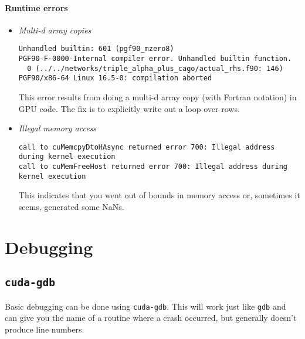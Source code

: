 \paragraph{Runtime errors}

\begin{itemize}

\item {\em Multi-d array copies}
\begin{verbatim}
Unhandled builtin: 601 (pgf90_mzero8)
PGF90-F-0000-Internal compiler error. Unhandled builtin function.       
  0 (../../networks/triple_alpha_plus_cago/actual_rhs.f90: 146)
PGF90/x86-64 Linux 16.5-0: compilation aborted
\end{verbatim}

This error results from doing a multi-d array copy (with Fortran
notation) in GPU code.  The fix is to explicitly write out a loop over
rows.

\item {\em Illegal memory access}

\begin{verbatim}
call to cuMemcpyDtoHAsync returned error 700: Illegal address during kernel execution
call to cuMemFreeHost returned error 700: Illegal address during kernel execution
\end{verbatim}
This indicates that you went out of bounds in memory access or,
sometimes it seems, generated some NaNs.

\end{itemize}


\section{Debugging}

\subsection{{\tt cuda-gdb}}

Basic debugging can be done using {\tt cuda-gdb}.  This will work just
like {\tt gdb} and can give you the name of a routine where a crash
occurred, but generally doesn't produce line numbers.
